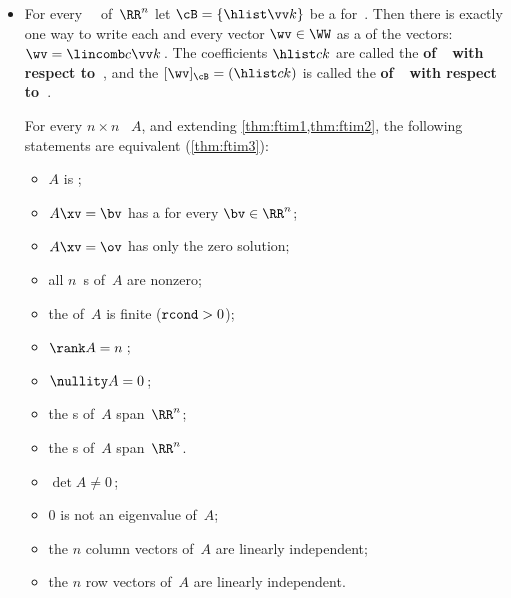 \begin{itemize}
\itemme \autoref{pro:bfe} finds a  for a ~\WW\ specified as the solutions of a system of equations.
\begin{enumerate}
\item Rewrite the system of equations as the  system \(A\xv=\ov\) so that the subspace~\WW\ is the  of \(m\times n\) matrix~\(A\).
\item  Find an \svd\ factorization \(A=\usv\) and let \(r=\rank A\) be the number of nonzero s (or effectively nonzero when the matrix has experimental errors).
\item The last \(n-r\) columns of~\(V\) form an  for the subspace~\WW.
\end{enumerate}

\item For every ~\WW\ of~\(\RR^n\) let \(\cB=\{\hlist\vv k\}\) be a  for~\WW.  
Then there is exactly one way to write each and every vector \(\wv\in\WW\) as a  of the  vectors: \(\wv=\lincomb c\vv k\)\,.
The coefficients \(\hlist ck\) are called the \textbf{ of~\wv\ with respect to~\cB}, and the  \([\wv]_{\cB}=(\hlist ck)\) is called the \textbf{ of~\wv\ with respect to~\cB}.

\itemme For every \(n\times n\) ~\(A\), and  
extending \cref{thm:ftim1,thm:ftim2}, the following statements are equivalent (\autoref{thm:ftim3}):
\begin{itemize}
\item \(A\) is ;
\item \(A\xv=\bv\) has a  for every \(\bv\in\RR^n\);
\item \(A\xv=\ov\) has only the zero solution;
\item all \(n\)~s of~\(A\) are nonzero;
\item the  of~\(A\) is finite (\(\verb|rcond|>0\));
\item {}\(\rank A=n\)\,;
\item {}\(\nullity A=0\)\,;
\item the s of~\(A\) span~\(\RR^n\);
\item the s of~\(A\) span~\(\RR^n\).
\item \(\det A\neq 0\)\,;
\item \(0\) is not an eigenvalue of~\(A\);
\item the \(n\) column vectors of~\(A\) are linearly independent;
\item the \(n\) row vectors of~\(A\) are linearly independent.
\end{itemize}








\end{itemize}

